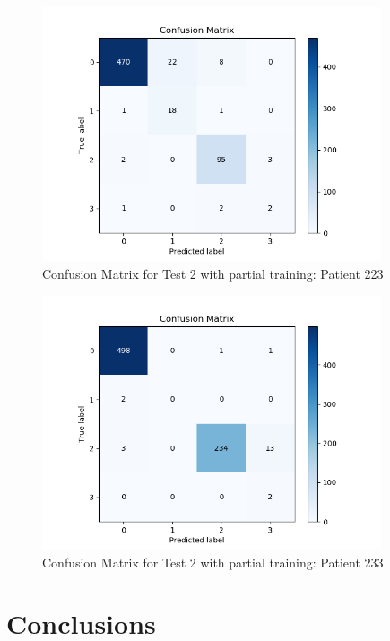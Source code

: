 \documentclass[LaM,binding=0.6cm]{sapthesis}
\begin{document}
\begin{figure}[H]  \centering
    \includegraphics[width=100mm,scale=0.7]{patient223-transfer-learn-nontrainable}
    \caption{Confusion Matrix for Test 2 with partial training: Patient 223}
    \label{fig:patient223-transfer-learn-nontrainable}
\end{figure}
\begin{figure}[H]  \centering
    \includegraphics[width=100mm,scale=0.7]{patient233-transfer-learn-nontrainable}
    \caption{Confusion Matrix for Test 2 with partial training: Patient 233}
    \label{fig:patient233-transfer-learn-nontrainable}
\end{figure}
\chapter{Conclusions}


\backmatter
\cleardoublepage
{}
\end{document}
